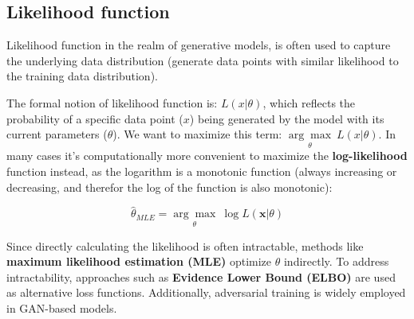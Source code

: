 \subsection{Likelihood function}
\label{appendix:likelihood_function}

Likelihood function in the realm of generative models, is often used to capture the underlying data distribution (generate data points with similar likelihood to the training data distribution).

The formal notion of likelihood function is: $L(x | \theta)$, which reflects the probability of a specific data point ($x$) being generated by the model with its current parameters ($\theta$). We want to maximize this term: $\underset{\theta}{\arg\max}\ L(x | \theta)$. In many cases it's computationally more convenient to maximize the \textbf{log-likelihood} function instead, as the logarithm is a monotonic function (always increasing or decreasing, and therefor the log of the function is also monotonic):

\[
    \hat{\theta}_{MLE} = \underset{\theta}{\arg\max} \ \log L(\mathbf{x} | \theta)
\]

Since directly calculating the likelihood is often intractable, methods like \textbf{maximum likelihood estimation (MLE)} optimize $\theta$ indirectly. To address intractability, approaches such as \textbf{Evidence Lower Bound (ELBO)} are used as alternative loss functions. Additionally, adversarial training is widely employed in GAN-based models.
